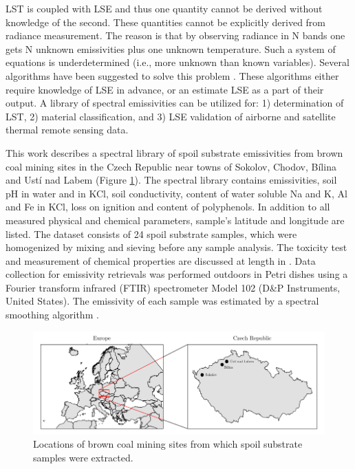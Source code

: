 \begin{appendices}
LST is coupled with LSE and thus one quantity cannot be derived without knowledge of the second. These quantities cannot be explicitly derived from radiance measurement. The reason is that by observing radiance in N bands one gets N unknown emissivities plus one unknown temperature. Such a system of equations is underdetermined (i.e., more unknown than known variables). Several algorithms have been suggested to solve this problem \cite{LT13}. These algorithms either require knowledge of LSE in advance, or an estimate LSE as a part of their output. A library of spectral emissivities can be utilized for: 1) determination of LST, 2) material classification, and 3) LSE validation of airborne and satellite thermal remote sensing data.

This work describes a spectral library of spoil substrate emissivities from brown coal mining sites in the Czech Republic near towns of Sokolov, Chodov, Bílina and Ustí nad Labem (Figure \ref{fig:SpoilSubstratesMap}). The spectral library contains emissivities, soil pH in water and in KCl, soil conductivity, content of water soluble Na and K, Al and Fe in KCl, loss on ignition and content of polyphenols. In addition to all measured physical and chemical parameters, sample's latitude and longitude are listed. The dataset consists of 24 spoil substrate samples, which were homogenized by mixing and sieving before any sample analysis. The toxicity test and measurement of chemical properties are discussed at length in \cite{FK05}. Data collection for emissivity retrievals was performed outdoors in Petri dishes using a Fourier transform infrared (FTIR) spectrometer Model 102 (D\&P Instruments, United States). The emissivity of each sample was estimated by a spectral smoothing algorithm \cite{HJ98}.

\begin{figure}[!t]
\centering
\includegraphics[width=0.95\linewidth]{pics/Chapter_05/map.pdf}
\vspace{1.5 em}
\caption{Locations of brown coal mining sites from which spoil substrate samples were extracted.}
\label{fig:SpoilSubstratesMap}
\end{figure}


\end{appendices}
